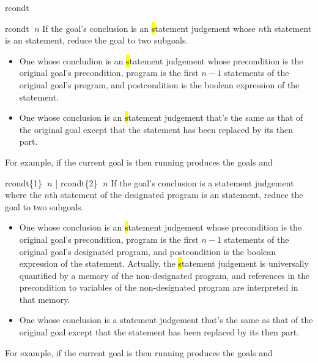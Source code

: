 \begin{tactic}{rcondt}
  \begin{tsyntax}{rcondt $\;n$}
    If the goal's conclusion is an \hl statement judgement whose $n$th
    statement is an  statement, reduce the goal to two
    subgoals.
    \begin{itemize}
    \item One whose concludion is an \hl statement judgement whose
      precondition is the original goal's precondition, program is the
      first $n-1$ statements of the original goal's program, and
      postcondition is the boolean expression of the 
      statement.
   
    \item One whose conclusion is an \hl statement judgement that's
      the same as that of the original goal except that the 
      statement has been replaced by its then part.
    \end{itemize}

    \medskip For example, if the current goal is
     then
    running 
    produces the goals
     and
  \end{tsyntax}

  \begin{tsyntax}{rcondt\{1\} $\;n$ | rcondt\{2\} $\;n$}
    If the goal's conclusion is a \prhl statement judgement where the
    $n$th statement of the designated program is an  statement,
    reduce the goal to two subgoals.
    \begin{itemize}
    \item One whose conclusion is an \hl statement judgement whose
      precondition is the original goal's precondition, program is the
      first $n-1$ statements of the original goal's designated
      program, and postcondition is the boolean expression of the
       statement. Actually, the \hl statement judgement is
      universally quantified by a memory of the non-designated
      program, and references in the precondition to variables of the
      non-designated program are interpreted in that memory.
   
    \item One whose conclusion is a \prhl statement judgement that's
      the same as that of the original goal except that the 
      statement has been replaced by its then part.
    \end{itemize}

  \medskip
  For example, if the current goal is
   then
  running 
  produces the goals
  and
  \end{tsyntax}
\end{tactic}
